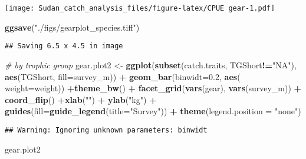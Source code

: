\documentclass[]{article}
\newenvironment{Shaded}{\begin{snugshade}}{\end{snugshade}}
\newcommand{\KeywordTok}[1]{\textcolor[rgb]{0.13,0.29,0.53}{\textbf{#1}}}
\newcommand{\DataTypeTok}[1]{\textcolor[rgb]{0.13,0.29,0.53}{#1}}
\newcommand{\FloatTok}[1]{\textcolor[rgb]{0.00,0.00,0.81}{#1}}
\newcommand{\StringTok}[1]{\textcolor[rgb]{0.31,0.60,0.02}{#1}}
\newcommand{\CommentTok}[1]{\textcolor[rgb]{0.56,0.35,0.01}{\textit{#1}}}
\newcommand{\OperatorTok}[1]{\textcolor[rgb]{0.81,0.36,0.00}{\textbf{#1}}}
\newcommand{\NormalTok}[1]{#1}
\begin{document}
\texttt{[image: Sudan\_catch\_analysis\_files/figure-latex/CPUE gear-1.pdf]}

\begin{Shaded}
\begin{Highlighting}[]
\KeywordTok{ggsave}\NormalTok{(}\StringTok{"./figs/gearplot_species.tiff"}\NormalTok{)}
\end{Highlighting}
\end{Shaded}

\begin{verbatim}
## Saving 6.5 x 4.5 in image
\end{verbatim}

\begin{Shaded}
\begin{Highlighting}[]
\CommentTok{# by trophic group}
\NormalTok{gear.plot2 <-}\StringTok{ }\KeywordTok{ggplot}\NormalTok{(}\KeywordTok{subset}\NormalTok{(catch.traits, TGShort}\OperatorTok{!=}\StringTok{"NA"}\NormalTok{), }\KeywordTok{aes}\NormalTok{(TGShort, }\DataTypeTok{fill=}\NormalTok{survey_m)) }\OperatorTok{+}\StringTok{ }\KeywordTok{geom_bar}\NormalTok{(}\DataTypeTok{binwidt=}\FloatTok{0.2}\NormalTok{, }\KeywordTok{aes}\NormalTok{( }\DataTypeTok{weight=}\NormalTok{weight)) }\OperatorTok{+}\KeywordTok{theme_bw}\NormalTok{() }\OperatorTok{+}\StringTok{ }\KeywordTok{facet_grid}\NormalTok{(}\KeywordTok{vars}\NormalTok{(gear), }\KeywordTok{vars}\NormalTok{(survey_m)) }\OperatorTok{+}\StringTok{ }\KeywordTok{coord_flip}\NormalTok{() }\OperatorTok{+}\KeywordTok{xlab}\NormalTok{(}\StringTok{""}\NormalTok{) }\OperatorTok{+}\StringTok{ }\KeywordTok{ylab}\NormalTok{(}\StringTok{"kg"}\NormalTok{)  }\OperatorTok{+}\StringTok{ }\KeywordTok{guides}\NormalTok{(}\DataTypeTok{fill=}\KeywordTok{guide_legend}\NormalTok{(}\DataTypeTok{title=}\StringTok{"Survey"}\NormalTok{)) }\OperatorTok{+}\StringTok{ }\KeywordTok{theme}\NormalTok{(}\DataTypeTok{legend.position =} \StringTok{"none"}\NormalTok{)}
\end{Highlighting}
\end{Shaded}

\begin{verbatim}
## Warning: Ignoring unknown parameters: binwidt
\end{verbatim}

\begin{Shaded}
\begin{Highlighting}[]
\NormalTok{gear.plot2}
\end{Highlighting}
\end{Shaded}
\end{document}
